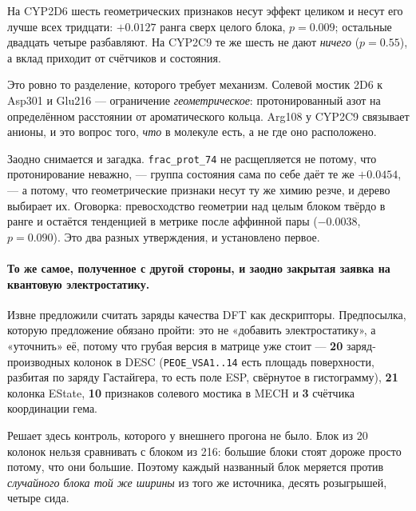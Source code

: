 На CYP2D6 шесть геометрических признаков несут эффект целиком и несут его лучше всех тридцати:
$+0.0127$ ранга сверх целого блока, $p = 0.009$; остальные двадцать четыре разбавляют. На
CYP2C9 те же шесть не дают \emph{ничего} ($p = 0.55$), а вклад приходит от счётчиков и
состояния.

Это ровно то разделение, которого требует механизм. Солевой мостик 2D6 к Asp301 и Glu216 ---
ограничение \emph{геометрическое}: протонированный азот на определённом расстоянии от
ароматического кольца. Arg108 у CYP2C9 связывает анионы, и это вопрос того, \emph{что} в
молекуле есть, а не где оно расположено.

Заодно снимается и загадка. \texttt{frac\_prot\_74} не расщепляется не потому, что
протонирование неважно, --- группа состояния сама по себе даёт те же $+0.0454$, --- а потому,
что геометрические признаки несут ту же химию резче, и дерево выбирает их. Оговорка: превосходство
геометрии над целым блоком твёрдо в ранге и остаётся тенденцией в метрике после аффинной пары
($-0.0038$, $p = 0.090$). Это два разных утверждения, и установлено первое.

\paragraph{То же самое, полученное с другой стороны, и заодно закрытая заявка на квантовую
электростатику.} Извне предложили считать заряды качества DFT как дескрипторы. Предпосылка, которую
предложение обязано пройти: это не «добавить электростатику», а «уточнить» её, потому что грубая
версия в матрице уже стоит --- \textbf{20} заряд-производных колонок в \textsc{DESC}
(\texttt{PEOE\_VSA1..14} есть площадь поверхности, разбитая по заряду Гастайгера, то есть поле ESP,
свёрнутое в гистограмму), \textbf{21} колонка EState, \textbf{10} признаков солевого мостика в
\textsc{MECH} и \textbf{3} счётчика координации гема.

Решает здесь контроль, которого у внешнего прогона не было. Блок из 20 колонок нельзя сравнивать с
блоком из 216: большие блоки стоят дороже просто потому, что они большие. Поэтому каждый названный
блок меряется против \emph{случайного блока той же ширины} из того же источника, десять розыгрышей,
четыре сида.

